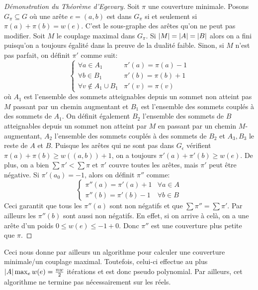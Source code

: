 \documentclass[math, info]{cours}
\begin{document}
\begin{proof}[Démonstration du Théorème d'Egevary]
	Soit $\pi$ une couverture minimale.
	Posons $G_{\pi} \subseteq G$ où une arête $e = (a, b)$ est dans $G_{\pi}$ si et seulement si $\pi(a) + \pi(b) = w(e)$.
	C'est le sous-graphe des arêtes qu'on ne peut pas modifier.
	Soit $M$ le couplage maximal dans $G_{\pi}$.
	Si $\left|M\right| = \left|A\right| = \left|B\right|$ alors on a fini puisqu'on a toujours égalité dans la preuve de la dualité faible.
	Sinon, si $M$ n'est pas parfait, on définit $\pi'$ comme suit:
	\begin{equation*}
		\begin{cases}
			\forall a \in A_{1}               & \pi'(a) = \pi(a) - 1 \\
			\forall b \in B_{1}               & \pi'(b) = \pi(b) + 1 \\
			\forall v \notin A_{1} \cup B_{1} & \pi'(v) = \pi(v)
		\end{cases}
	\end{equation*}
	où $A_{1}$ est l'ensemble des sommets atteignables depuis un sommet non atteint pas $M$ passant par un chemin augmentant et $B_{1}$ est l'ensemble des sommets couplés à des sommets de $A_{1}$.
	On définit également $B_{2}$ l'ensemble des sommets de $B$ atteignables depuis un sommet non atteint par $M$ en passant par un chemin $M$-augmentant, $A_{2}$ l'ensemble des sommets couplés à des sommets de $B_{2}$ et $A_{3}, B_{3}$ le reste de $A$ et $B$.
	Puisque les arêtes qui ne sont pas dans $G_{\epsilon}$ vérifient $\pi(a) + \pi(b) \geq w\left( (a,b) \right) + 1$, on a toujours $\pi'(a) + \pi'(b) \geq w(e)$.
	De plus, on a bien $\sum \pi' < \sum \pi$ et $\pi'$ couvre toutes les arêtes, mais $\pi'$ peut être négative.
	Si $\pi'(a_{0}) = -1$, alors on définit $\pi''$ comme:
	\begin{equation*}
		\begin{cases}
			\pi''(a) = \pi'(a) + 1 & \forall a \in A \\
			\pi''(b) = \pi'(b) - 1 & \forall b \in B
		\end{cases}
	\end{equation*}
	Ceci garantit que tous les $\pi''(a)$ sont non négatifs et que $\sum\pi'' = \sum\pi'$.
	Par ailleurs les $\pi''(b)$ sont aussi non négatifs. En effet, si on arrive à celà, on a une arête d'un poids $0 \leq w(e) \leq -1 + 0$.
	Donc $\pi''$ est une couverture plus petite que $\pi$.
\end{proof}

Ceci nous donne par ailleurs un algorithme pour calculer une couverture minimale/un couplage maximal.
Toutefois, celui-ci effectue au plus $\left|A\right|\max_{e} w(e) = \frac{nw}{2}$ itérations et est donc pseudo polynomial.
Par ailleurs, cet algorithme ne termine pas nécessairement sur les réels.
\medskip
\end{document}

